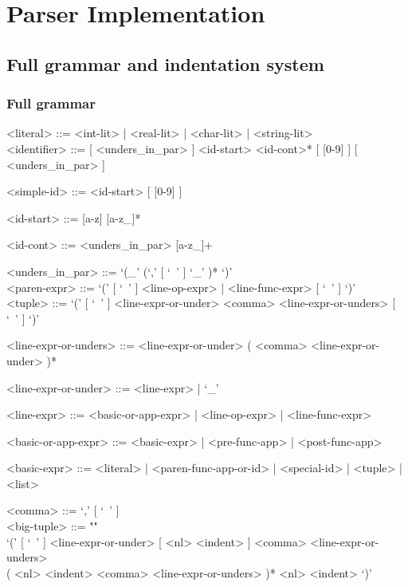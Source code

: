 \documentclass{article}
\begin{document}
\section{Parser Implementation}

\subsection{Full grammar and indentation system}

\subsubsection{Full grammar}

\begin{grammar}

<literal> ::= <int-lit> | <real-lit> | <char-lit> | <string-lit>
\\

<identifier> ::=
[ <unders_in_par> ] <id-start> <id-cont>* [ [0-9] ] [ <unders_in_par> ]

<simple-id> ::= <id-start> [ [0-9] ]

<id-start> ::= [a-z] [a-z_]*

<id-cont> ::= <unders_in_par> [a-z_]+

<unders_in_par> ::= `(_' (`,' [ `\ ' ] `_' )* `)'
\\

<paren-expr> ::= `(' [ `\ ' ] <line-op-expr> | <line-func-expr> [ `\ ' ] `)'
\\

<tuple> ::=
`(' [ `\ ' ] <line-expr-or-under> <comma> <line-expr-or-unders> [ `\ ' ] `)'

<line-expr-or-unders> ::=
<line-expr-or-under> ( <comma> <line-expr-or-under> )*

<line-expr-or-under> ::= <line-expr> | `_'

<line-expr> ::= <basic-or-app-expr> | <line-op-expr> | <line-func-expr>

<basic-or-app-expr> ::= <basic-expr> | <pre-func-app> | <post-func-app>

<basic-expr> ::=
<literal> | <paren-func-app-or-id> | <special-id> | <tuple> | <list>

<comma> ::= `,' [ `\ ' ]
\\

<big-tuple> ::= ""\\
`(' [ `\ ' ] <line-expr-or-under> [ <nl> <indent> ]
<comma> <line-expr-or-unders> \\
( <nl> <indent> <comma> <line-expr-or-unders> )*
<nl> <indent> `)'
\\


\end{grammar}
\end{document}
